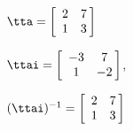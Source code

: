 {$\tta = \left[
\begin{array}{cc}
   2 & 7\\
   1 & 3
\end{array}\hskip -3pt \right]$
}
{$\ttai = \left[
\begin{array}{cc}
-3 & 7\\
1 & -2 \end{array} \hskip -3pt
\right]$,

$(\ttai)^{-1} = \left[
\begin{array}{cc}
 2 & 7\\
   1 & 3
 \end{array}\hskip -3pt \right]$
}
